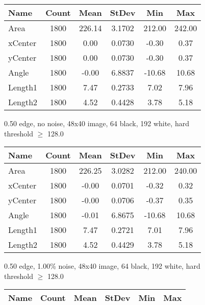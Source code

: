 \documentclass{article}
\begin{document}
\begin{doublespace}
\begin{figure}[ht!]
\centering
  \setlength{\tabcolsep}{15pt}
  \begin{tabular}{| l | c | c | c | c | c |}
    \hline
    Name   & Count  &   Mean  &  StDev  &    Min  &    Max \\ \hline
    Area &  1800  & 226.14  & 3.1702  & 212.00  & 242.00 \\ \hline
    xCenter &  1800  &   0.00  & 0.0730  &  -0.30  &   0.37 \\ \hline
    yCenter &  1800  &   0.00  & 0.0730  &  -0.30  &   0.37 \\ \hline
   Angle &  1800  &  -0.00  & 6.8837  & -10.68  &  10.68 \\ \hline
   Length1 &  1800  &   7.47  & 0.2733  &   7.02  &   7.96 \\ \hline
   Length2 &  1800  &   4.52  & 0.4428  &   3.78  &   5.18 \\ \hline
  \end{tabular}
\caption{0.50 edge, no noise, 48x40 image, 64 black, 192 white, hard threshold $\geq$ 128.0}
\end{figure}
\begin{figure}[ht!]
\centering
  \setlength{\tabcolsep}{15pt}
  \begin{tabular}{| l | c | c | c | c | c |}
    \hline
  Name    &Count &    Mean &   StDev  &    Min &     Max \\ \hline 
    Area  & 1800 &  226.25 &  3.0282  & 212.00 &  240.00 \\ \hline
 xCenter  & 1800 &   -0.00 &  0.0701  &  -0.32 &    0.32 \\ \hline
 yCenter  & 1800 &   -0.00 &  0.0706  &  -0.37 &    0.35 \\ \hline
   Angle  & 1800 &   -0.01 &  6.8675  & -10.68 &   10.68 \\ \hline
 Length1  & 1800 &    7.47 &  0.2721  &   7.01 &    7.96 \\ \hline
 Length2  & 1800 &    4.52 &  0.4429  &   3.78 &    5.18 \\ \hline
  \end{tabular}
\caption{0.50 edge,  1.00\% noise, 48x40 image, 64 black, 192 white, hard threshold $\geq$ 128.0}
\end{figure}
\begin{figure}[ht!]
\centering
  \setlength{\tabcolsep}{15pt}
  \begin{tabular}{| l | c | c | c | c | c |}
    \hline
  Name    &Count &    Mean &   StDev  &    Min &     Max \\ \hline

\end{tabular}
\end{figure}
\end{doublespace}
\end{document}
